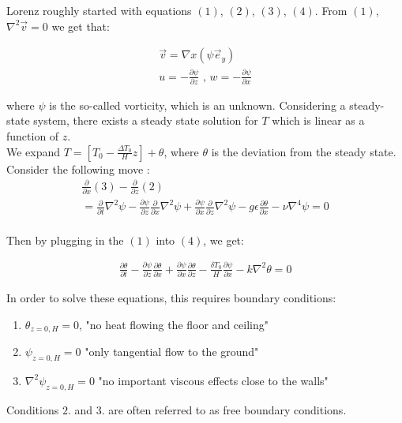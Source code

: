 Lorenz roughly started with equations $(1)$, $(2)$, $(3)$, $(4)$. From $(1)$, $\nabla^2 \vec{v} = 0$ we get that:

\begin{align*}
    \vec{v} = \nabla x (\psi \vec{e}_y)\\
    u = -\frac{\partial \psi}{\partial z} \text{ , } w = -\frac{\partial \psi}{\partial x}
\end{align*}

where $\psi$ is the so-called vorticity, which is an unknown. Considering a steady-state system, there exists a steady state solution for $T$ which is linear as a function of $z$. \\

We expand $T = \left[ T_0 - \frac{\Delta T_0}{H} z \right] + \theta$, where $\theta$ is the deviation from the steady state. Consider the following move : 
\begin{align*}
    \frac{\partial}{\partial x} (3) - \frac{\partial}{\partial z} (2) \\
    = \frac{\partial}{\partial t} \nabla^2 \psi - \frac{\partial \psi}{\partial z} \frac{\partial}{\partial x} \nabla^2 \psi + \frac{\partial \psi}{\partial x} \frac{\partial}{\partial z} \nabla^2 \psi - g \epsilon \frac{\partial \theta}{\partial x} - \nu \nabla^4 \psi = 0\\
\end{align*}

Then by plugging in the $(1)$ into $(4)$, we get:

\begin{align*}
    \frac{\partial \theta}{\partial t} - \frac{\partial \psi}{\partial z} \frac{\partial \theta}{\partial x} + \frac{\partial \psi}{\partial x} \frac{\partial \theta}{\partial z} -  \frac{\delta T_0}{H} \frac{\partial \psi}{\partial x} - k \nabla^2 \theta = 0
\end{align*}

In order to solve these equations, this requires boundary conditions:

\begin{enumerate}
    \item $\theta_{z = 0,H} = 0$, "no heat flowing the floor and ceiling"
    \item $\psi_{z = 0,H} = 0$ "only tangential flow to the ground"
    \item $\nabla^2 \psi_{z = 0,H} = 0$ "no important viscous effects close to the walls"
\end{enumerate}

Conditions $2.$ and $3.$ are often referred to as free boundary conditions. \\

